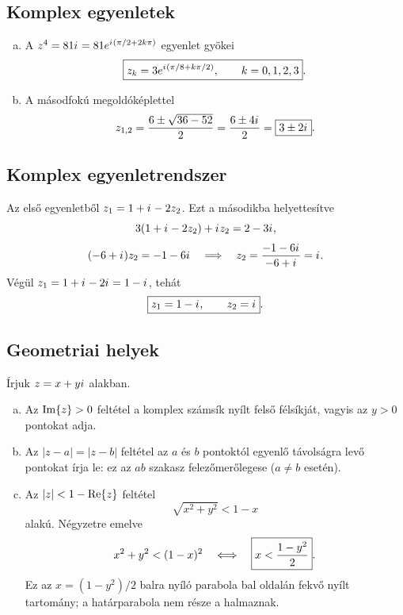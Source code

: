 \documentclass{szb-solution}
\begin{document}
\subsection{Komplex egyenletek}

\begin{enumerate}[a)]
  \item A $z^4=81{i\mkern1mu}=81e^{{i\mkern1mu}(\pi/2+2k\pi)}$ egyenlet gyökei
        $$
          \boxed{
            z_k=3e^{{i\mkern1mu}(\pi/8+k\pi/2)},
            \qquad k=0,1,2,3
          }
          \text.
        $$

  \item A másodfokú megoldóképlettel
        $$
          z_{1,2}
          =\frac{6\pm\sqrt{36-52}}{2}
          =\frac{6\pm4{i\mkern1mu}}{2}
          =\boxed{3\pm2{i\mkern1mu}}
          \text.
        $$
\end{enumerate}

\subsection{Komplex egyenletrendszer}

Az első egyenletből $z_1=1+{i\mkern1mu}-2z_2$. Ezt a másodikba helyettesítve
$$
  3(1+{i\mkern1mu}-2z_2)+{i\mkern1mu} z_2=2-3{i\mkern1mu},
$$
$$
  (-6+{i\mkern1mu})z_2=-1-6{i\mkern1mu}
  \quad\Longrightarrow\quad
  z_2=\frac{-1-6{i\mkern1mu}}{-6+{i\mkern1mu}}={i\mkern1mu}
  \text.
$$
Végül $z_1=1+{i\mkern1mu}-2{i\mkern1mu}=1-{i\mkern1mu}$, tehát
$$
  \boxed{z_1=1-{i\mkern1mu},
  \qquad z_2={i\mkern1mu}}
  \text.
$$

\subsection{Geometriai helyek}

Írjuk $z=x+y{i\mkern1mu}$ alakban.

\begin{enumerate}[a)]
  \item Az $\operatorname{Im}\{z\}>0$ feltétel a komplex számsík nyílt felső félsíkját,
        vagyis az $y>0$ pontokat adja.

  \item Az $|z-a|=|z-b|$ feltétel az $a$ és $b$ pontoktól egyenlő távolságra
        levő pontokat írja le: ez az $ab$ szakasz felezőmerőlegese
        ($a\neq b$ esetén).

  \item Az $|z|<1-\operatorname{Re}\{z\}$ feltétel
        $$
          \sqrt{x^2+y^2}<1-x
        $$
        alakú. Négyzetre emelve
        $$
          x^2+y^2<(1-x)^2
          \quad\Longleftrightarrow\quad
          \boxed{x<\frac{1-y^2}{2}}
          \text.
        $$
        Ez az $x=(1-y^2)/2$ balra nyíló parabola bal oldalán fekvő nyílt
        tartomány; a határparabola nem része a halmaznak.
\end{enumerate}
\end{document}
